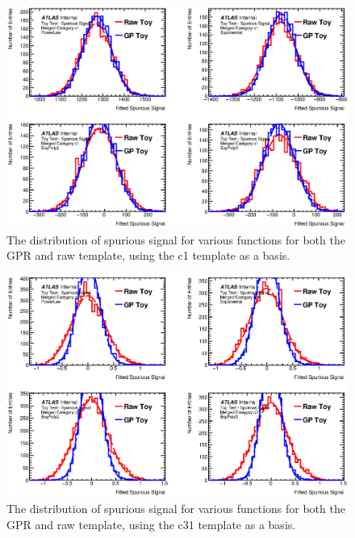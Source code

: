 \begin{figure} 
\begin{center}
  \includegraphics[width=\textwidth]{figures/background/gpr/validation/ToyTest_FitSigVals_Merged_Category_c1NoSig.eps}   
   \caption{The distribution of spurious signal for various functions for both the GPR and raw template, using the c1 template as a basis.}
\label{fig:c1NoSig}
\end{center}
\end{figure}

\begin{figure} 
\begin{center}
  \includegraphics[width=\textwidth]{figures/background/gpr/validation/ToyTest_FitSigVals_Merged_Category_c31NoSig.eps}  
 \caption{The distribution of spurious signal for various functions for both the GPR and raw template, using the c31 template as a basis.}
  \label{fig:c31NoSig}
\end{center}
\end{figure}

